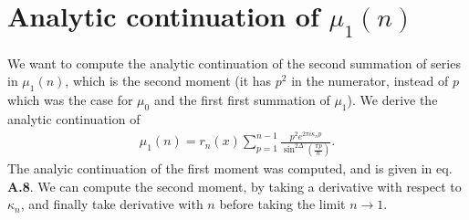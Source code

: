\documentclass[11pt]{article}
\newcommand{\lb}{\left(}
\newcommand{\rb}{\right)}
\begin{document}
\section{\texorpdfstring{Analytic continuation of $\mu_1(n)$}{Analytic continuation of mu1(n)}}
We want to compute the analytic continuation of the second summation of series in $\mu_1(n)$, which is the second moment (it has $p^2$ in the numerator, instead of $p$ which was the case for $\mu_0$ and the first first summation of $\mu_1$). We derive the analytic continuation of 
\begin{align}
    \mu_1(n) = r_n(x) \sum_{p=1}^{n-1} \frac{p^2 e^{2 \pi i \kappa_n p}}{\sin ^{2\Delta} \lb \frac{\pi p}{n}\rb} .
\end{align}
  The analyic continuation of the first moment was computed, and is given in eq. \textbf{A.8}. We can compute the second moment, by taking a derivative with respect to $\kappa_n$, and finally take derivative with $n$ before taking the limit $n \to 1$. 
\end{document}
